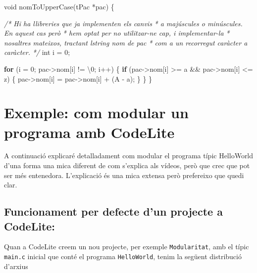 \documentclass[]{book}
\newenvironment{Shaded}{\begin{snugshade}}{\end{snugshade}}
\newcommand{\CharTok}[1]{\textcolor[rgb]{0.31,0.60,0.02}{#1}}
\newcommand{\CommentTok}[1]{\textcolor[rgb]{0.56,0.35,0.01}{\textit{#1}}}
\newcommand{\ControlFlowTok}[1]{\textcolor[rgb]{0.13,0.29,0.53}{\textbf{#1}}}
\newcommand{\DataTypeTok}[1]{\textcolor[rgb]{0.13,0.29,0.53}{#1}}
\newcommand{\DecValTok}[1]{\textcolor[rgb]{0.00,0.00,0.81}{#1}}
\newcommand{\NormalTok}[1]{#1}
\begin{document}
\begin{Shaded}
\begin{Highlighting}[]
\DataTypeTok{void}\NormalTok{ nomToUpperCase(tPac *pac) \{}
    
    \CommentTok{/* Hi ha llibreries que ja implementen els canvis}
\CommentTok{     * a majúscules o minúscules. En aquest cas però}
\CommentTok{     * hem optat per no utilitzar{-}ne cap, i implementar{-}la}
\CommentTok{     * nosaltres mateixos, tractant l\textquotesingle{}string nom de pac}
\CommentTok{     * com a un recorregut caràcter a caràcter.}
\CommentTok{     */}
    \DataTypeTok{int}\NormalTok{ i = }\DecValTok{0}\NormalTok{;}

    \ControlFlowTok{for}\NormalTok{ (i = }\DecValTok{0}\NormalTok{; pac{-}\textgreater{}nom[i] != }\CharTok{\textquotesingle{}\textbackslash{}0\textquotesingle{}}\NormalTok{; i++) \{}
        \ControlFlowTok{if}\NormalTok{ (pac{-}\textgreater{}nom[i] \textgreater{}= }\CharTok{\textquotesingle{}a\textquotesingle{}}\NormalTok{ \&\& pac{-}\textgreater{}nom[i] \textless{}= }\CharTok{\textquotesingle{}z\textquotesingle{}}\NormalTok{) \{}
\NormalTok{            pac{-}\textgreater{}nom[i] = pac{-}\textgreater{}nom[i] + (}\CharTok{\textquotesingle{}A\textquotesingle{}}\NormalTok{ {-} }\CharTok{\textquotesingle{}a\textquotesingle{}}\NormalTok{);}
\NormalTok{        \}}
\NormalTok{    \}}
\NormalTok{\}}
\end{Highlighting}
\end{Shaded}

\hypertarget{exemple-com-modular-un-programa-amb-codelite}{%
\section{Exemple: com modular un programa amb CodeLite}\label{exemple-com-modular-un-programa-amb-codelite}}

A continuació explicaré detalladament com modular el programa típic HelloWorld d'una forma una mica diferent de com s'explica als vídeos, però que crec que pot ser més entenedora. L'explicació és una mica extensa però prefereixo que quedi clar.

\hypertarget{funcionament-per-defecte-dun-projecte-a-codelite}{%
\subsection{Funcionament per defecte d'un projecte a CodeLite:}\label{funcionament-per-defecte-dun-projecte-a-codelite}}

Quan a CodeLite creem un nou projecte, per exemple \texttt{Modularitat}, amb el típic \texttt{main.c} inicial que conté el programa \texttt{HelloWorld}, tenim la següent distribució d'arxius
\end{document}
